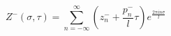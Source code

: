 \begin{equation}
    Z^- (\sigma,\tau) = \sum_{n=-\infty}^{\infty} \left(
                        z_n^- + \frac{p_n^-}{l} \tau \right)
                        e^{\textstyle{\frac{2\pi i n \sigma}{l}}}
\end{equation}

